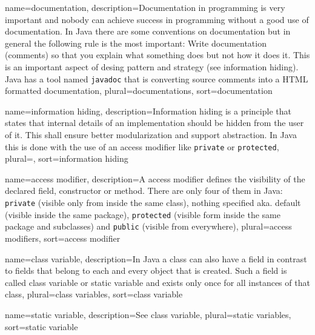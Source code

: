 {
	name=documentation,
	description={Documentation in programming is very important and nobody
		can achieve success in programming without a good use of
		documentation. In Java there are some conventions on 
		documentation but in general the following rule is the most
		important: Write documentation (comments) so that you 
		explain what something does but not how it does it. This is
		an important aspect of desing pattern and strategy (see
		\gls{information hiding}). 
		Java has a tool named \lstinline!javadoc!
		that is converting source comments into a HTML formatted
		documentation},
	plural=documentations,
	sort=documentation
}

{
	name={information hiding},
	description={Information hiding is a principle that states that 
		internal details of an implementation should be hidden
		from the user of it. This shall ensure better modularization
		and support abstraction. In Java this is done with the use
		of an \gls{access modifier} like \lstinline!private! or
		\lstinline!protected!},
	plural={},
	sort={information hiding}
}

{
	name={access modifier},
	description={A access modifier defines the visibility of the 
		declared field, constructor or method. There are only four of
		them in Java: 
		\lstinline!private! (visible only from inside the same class), 
		nothing specified aka. default (visible inside the same package),
		\lstinline!protected! (visible form inside the same package 
			and subclasses) and
		\lstinline!public! (visible from everywhere)},
	plural={access modifiers},
	sort={access modifier}
}

{
	name={class variable},
	description={In Java a class can also have a field in contrast to 
		fields that belong to each and every object that is created.
		Such a field is called class variable or 
		\gls{static variable} and exists only once for all instances
		of that class},
	plural={class variables},
	sort={class variable}
}

{
	name={static variable},
	description={See \gls{class variable}},
	plural={static variables},
	sort={static variable}	
}
